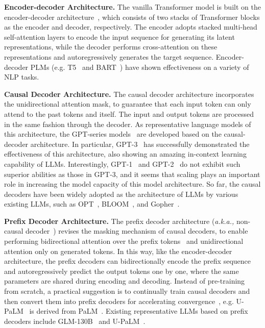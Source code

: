 {\textbf{Encoder-decoder Architecture.} The vanilla Transformer model is built on the encoder-decoder architecture~\cite{Vaswani-NIPS-2017-Attention}, which consists of two stacks of Transformer blocks as the encoder and decoder, respectively. The encoder adopts stacked multi-head self-attention layers to encode the input sequence for generating its latent representations, while the decoder performs cross-attention on these representations and autoregressively generates the target sequence. Encoder-decoder PLMs (e.g. T5~\cite{Raffel-JMLR-2020-Exploring} and BART~\cite{Lewis-ACL-2020-BART}) have shown effectiveness on a variety of NLP tasks.

\textbf{Causal Decoder Architecture.} The causal decoder architecture incorporates the unidirectional attention mask, to guarantee that each input token can only attend to the past tokens and itself. The input and output tokens are processed in the same fashion through the decoder. As representative language models of this architecture, the GPT-series models~\cite{radford-openai-2018-improving,radford-blog-2019-language,Brown-NeurIPS-2020-Language} are developed based on the causal-decoder architecture. In particular, GPT-3~\cite{Brown-NeurIPS-2020-Language} has successfully demonstrated the effectiveness of this architecture, also showing an amazing in-context learning capability of LLMs. Interestingly, GPT-1~\cite{radford-openai-2018-improving} and GPT-2~\cite{radford-blog-2019-language} do not exhibit such superior abilities as those in GPT-3, and it seems that scaling plays an important role in increasing the model capacity of this model architecture. So far, the causal decoders have been widely adopted as the architecture of LLMs by various existing LLMs, such as OPT~\cite{Zhang-arxiv-2022-OPT}, BLOOM~\cite{Scao-arxiv-2022-BLOOM}, and Gopher~\cite{Rae-arxiv-2021-Scaling}. 

\textbf{Prefix Decoder Architecture.} The prefix decoder architecture {(\emph{a.k.a.,} non-causal decoder~\cite{Zhang-ICML-2022-Examining})}  revises the masking mechanism of causal decoders, to enable performing bidirectional attention over the prefix tokens~\cite{Dong-NIPS-2019-Unified} and unidirectional attention only on generated tokens. In this way, like the encoder-decoder architecture, the prefix decoders can bidirectionally encode the prefix sequence and autoregressively predict the output tokens one by one, where the same parameters are shared during encoding and decoding. Instead of pre-training from scratch, a practical suggestion is to continually train causal decoders and then convert them into prefix decoders for accelerating convergence~\cite{Wang-ICML-2022-What}, e.g. U-PaLM~\cite{Tay-arxiv-2022-Transcending} is derived from PaLM~\cite{Chowdhery-arxiv-2022-PaLM}. Existing representative LLMs based on prefix decoders include GLM-130B~\cite{Zeng-arxiv-2022-GLM} and U-PaLM~\cite{Tay-arxiv-2022-Transcending}.

}
